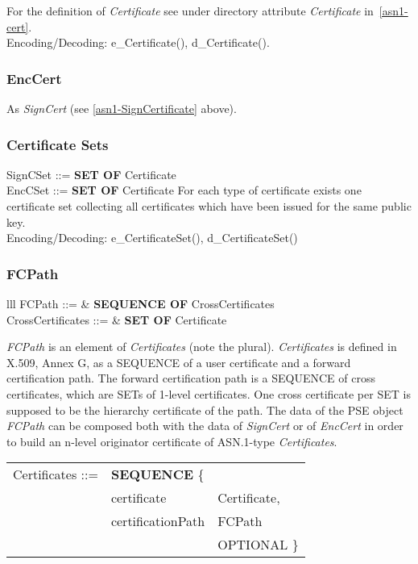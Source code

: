 For the definition of {\em Certificate} see under 
directory attribute {\em Certificate} in~\ref{asn1-cert}.
\\ [1em]
Encoding/Decoding: e\_Certificate(), d\_Certificate().

\subsubsection{EncCert}
\label{asn1-EncrCertificate}

As {\em SignCert} (see \ref{asn1-SignCertificate} above).

\subsubsection{Certificate Sets}
\label{asn1-certificateset}
{\small
\bc
        SignCSet ::= {\bf SET OF} Certificate \\
        EncCSet ::= {\bf SET OF} Certificate
\ec
}
For each type of certificate exists one certificate set collecting all
certificates which have been issued for the same public key. \\ [1ex]
Encoding/Decoding: e\_CertificateSet(), d\_CertificateSet()

\subsubsection{FCPath}
\label{asn1-FCPath}

{\small
\begin {center}
\begin {tabular}{lll}
FCPath ::= &  {
		 {\bf SEQUENCE OF} CrossCertificates} \\[1ex]
CrossCertificates ::= &  {{\bf SET OF} Certificate}
\end {tabular}
\end {center}
}

{\em FCPath} is an element of {\em Certificates} (note the plural).
{\em Certificates} is defined in X.509, Annex G,
as a SEQUENCE of a user certificate and a forward certification path.
The forward certification path is a SEQUENCE of cross certificates,
which are SETs of 1-level certificates.
One cross certificate per SET is supposed to be
the hierarchy certificate of the path.
The data of the PSE object {\em FCPath}
can be composed both with the data of
{\em SignCert} or of
{\em EncCert} in order to build an
n-level originator certificate of ASN.1-type {\em Certificates}.

{\small
\begin {center}
\begin {tabular}{lll}
Certificates ::= & {\bf SEQUENCE} \{  & \\
  & certificate          & Certificate,                \\
  & certificationPath    & FCPath    \\
  &                      & OPTIONAL \} \\[1ex]
\end {tabular}
\end {center}
}

